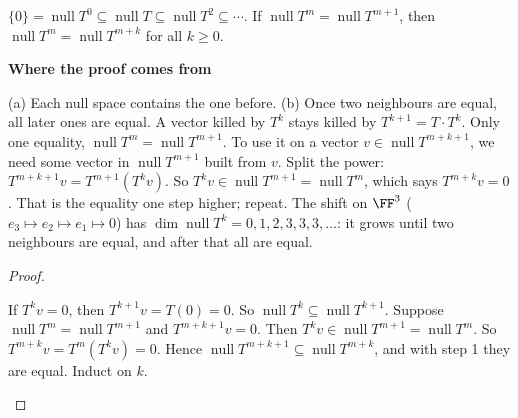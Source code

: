 \documentclass[10pt]{scrartcl}
\DeclareMathOperator{\nul}{null}
\newenvironment{motive}{\begin{mdframed}[style=thinkbox]\textbf{\color{OliveGreen!75!black}Where the proof comes from}\begin{description}[leftmargin=0.9em,labelindent=0pt,itemsep=2pt,topsep=2pt,font=\normalfont\bfseries\color{OliveGreen!70!black}]}{\end{description}\end{mdframed}}
\newenvironment{steps}{\begin{enumerate}[label=\arabic*.,leftmargin=1.5em,itemsep=2pt,topsep=2pt]}{\end{enumerate}}
\begin{document}
\begin{proposition*}
  $\{0\}=\nul T^0\subseteq\nul T\subseteq\nul T^2\subseteq\cdots$. If $\nul T^m=\nul T^{m+1}$, then $\nul T^m=\nul T^{m+k}$ for all $k\ge0$.
\end{proposition*}
\begin{motive}
  \ii[Want.] (a) Each null space contains the one before. (b) Once two neighbours are equal, all later ones are equal.
  \ii[(a)] A vector killed by $T^k$ stays killed by $T^{k+1}=T\cdot T^k$.
   Only one equality, $\nul T^m=\nul T^{m+1}$. To use it on a vector $v\in\nul T^{m+k+1}$, we need some vector in $\nul T^{m+1}$ built from $v$.
   Split the power: $T^{m+k+1}v=T^{m+1}(T^kv)$. So $T^kv\in\nul T^{m+1}=\nul T^m$, which says $T^{m+k}v=0$. That is the equality one step higher; repeat.
  \ii[Example.] The shift on $\FF^3$ ($e_3\mapsto e_2\mapsto e_1\mapsto0$) has $\dim\nul T^k=0,1,2,3,3,3,\dots$: it grows until two neighbours are equal, and after that all are equal.
\end{motive}
\begin{proof}
  \begin{steps}
    \ii If $T^kv=0$, then $T^{k+1}v=T(0)=0$. So $\nul T^k\subseteq\nul T^{k+1}$.
    \ii Suppose $\nul T^m=\nul T^{m+1}$ and $T^{m+k+1}v=0$. Then $T^kv\in\nul T^{m+1}=\nul T^m$.
    \ii So $T^{m+k}v=T^m(T^kv)=0$. Hence $\nul T^{m+k+1}\subseteq\nul T^{m+k}$, and with step 1 they are equal. Induct on $k$.
  \end{steps}
\end{proof}
\end{document}
